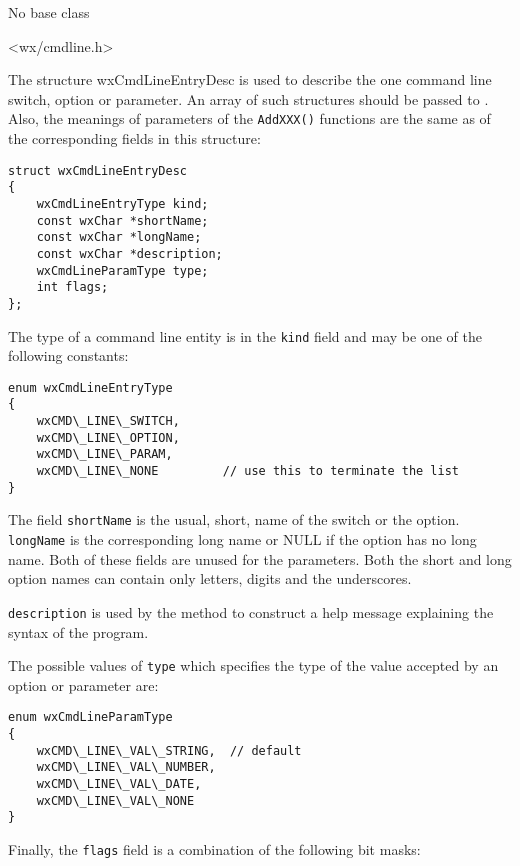 
No base class


<wx/cmdline.h>


The structure wxCmdLineEntryDesc is used to describe the one command
line switch, option or parameter. An array of such structures should be passed
to . Also, the meanings of parameters
of the {\tt AddXXX()} functions are the same as of the corresponding fields in
this structure:

\begin{verbatim}
struct wxCmdLineEntryDesc
{
    wxCmdLineEntryType kind;
    const wxChar *shortName;
    const wxChar *longName;
    const wxChar *description;
    wxCmdLineParamType type;
    int flags;
};
\end{verbatim}

The type of a command line entity is in the {\tt kind} field and may be one of
the following constants:

{\small%
\begin{verbatim}
enum wxCmdLineEntryType
{
    wxCMD\_LINE\_SWITCH,
    wxCMD\_LINE\_OPTION,
    wxCMD\_LINE\_PARAM,
    wxCMD\_LINE\_NONE         // use this to terminate the list
}
\end{verbatim}
}

The field {\tt shortName} is the usual, short, name of the switch or the option.
{\tt longName} is the corresponding long name or NULL if the option has no long
name. Both of these fields are unused for the parameters. Both the short and
long option names can contain only letters, digits and the underscores.

{\tt description} is used by the  method
to construct a help message explaining the syntax of the program.

The possible values of {\tt type} which specifies the type of the value accepted
by an option or parameter are:

{\small%
\begin{verbatim}
enum wxCmdLineParamType
{
    wxCMD\_LINE\_VAL\_STRING,  // default
    wxCMD\_LINE\_VAL\_NUMBER,
    wxCMD\_LINE\_VAL\_DATE,
    wxCMD\_LINE\_VAL\_NONE
}
\end{verbatim}
}

Finally, the {\tt flags} field is a combination of the following bit masks:

